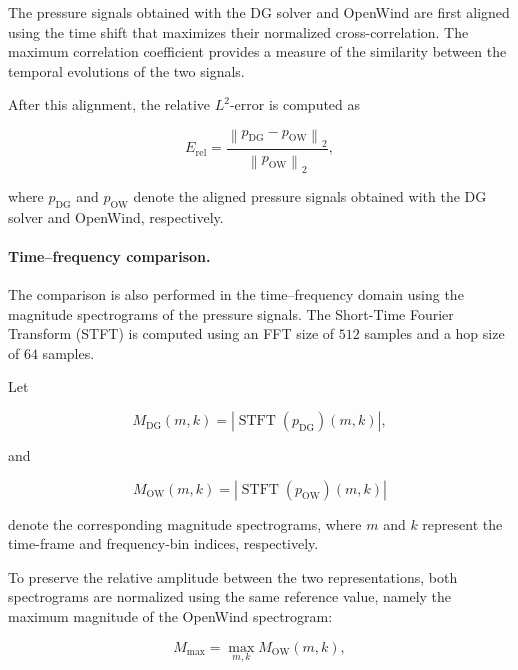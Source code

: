 \documentclass[11pt,a4paper]{report}
\theoremstyle{plain}
\theoremstyle{definition}
\begin{document}
The pressure signals obtained with the DG solver and OpenWind are first aligned
using the time shift that maximizes their normalized cross-correlation. The
maximum correlation coefficient provides a measure of the similarity between
the temporal evolutions of the two signals.

After this alignment, the relative \(L^2\)-error is computed as

\begin{equation}
E_{\mathrm{rel}}
=
\frac{
\left\|
p_{\mathrm{DG}}-p_{\mathrm{OW}}
\right\|_2
}{
\left\|
p_{\mathrm{OW}}
\right\|_2
},
\label{eq:openwind_relative_error}
\end{equation}

where \(p_{\mathrm{DG}}\) and \(p_{\mathrm{OW}}\) denote the aligned pressure
signals obtained with the DG solver and OpenWind, respectively.

\paragraph{Time--frequency comparison.}

The comparison is also performed in the time--frequency domain using the
magnitude spectrograms of the pressure signals. The Short-Time Fourier
Transform (STFT) is computed using an FFT size of \(512\) samples and a hop
size of \(64\) samples.

Let

\begin{equation}
M_{\mathrm{DG}}(m,k)
=
\left|
\operatorname{STFT}
\left(
p_{\mathrm{DG}}
\right)(m,k)
\right|,
\end{equation}

and

\begin{equation}
M_{\mathrm{OW}}(m,k)
=
\left|
\operatorname{STFT}
\left(
p_{\mathrm{OW}}
\right)(m,k)
\right|
\end{equation}

denote the corresponding magnitude spectrograms, where \(m\) and \(k\)
represent the time-frame and frequency-bin indices, respectively.

To preserve the relative amplitude between the two representations, both
spectrograms are normalized using the same reference value, namely the maximum
magnitude of the OpenWind spectrogram:

\begin{equation}
M_{\max}
=
\max_{m,k}
M_{\mathrm{OW}}(m,k),
\end{equation}
\end{document}
